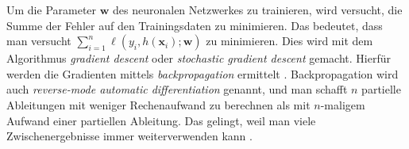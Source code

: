Um die Parameter $\mathbf{w}$ des neuronalen Netzwerkes zu trainieren, wird versucht, die Summe der Fehler auf den Trainingsdaten zu minimieren. Das bedeutet, dass
man versucht $\sum_{i=1}^n \ell(y_i, h(\mathbf{x}_i); \mathbf{w})$ zu minimieren. Dies wird mit dem Algorithmus \textit{gradient descent} oder \textit{stochastic gradient descent}
gemacht. Hierf\"ur werden die Gradienten mittels \textit{backpropagation} ermittelt \cite{werbos}. Backpropagation wird auch \textit{reverse-mode automatic differentiation} genannt, und man
schafft $n$ partielle Ableitungen mit weniger Rechenaufwand zu berechnen als mit $n$-maligem Aufwand einer partiellen Ableitung. Das gelingt, weil man viele
Zwischenergebnisse immer weiterverwenden kann \cite[Kaptitel 7.3]{strang}.